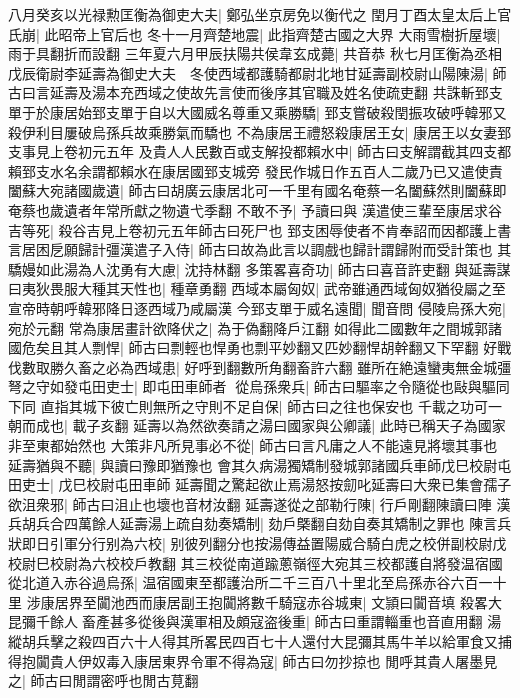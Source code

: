 八月癸亥以光禄勲匡衡為御吏大夫|{
	鄭弘坐京房免以衡代之}
閏月丁酉太皇太后上官氏崩|{
	此昭帝上官后也}
冬十一月齊楚地震|{
	此指齊楚古國之大界}
大雨雪樹折屋壞|{
	雨于具翻折而設翻}
三年夏六月甲辰扶陽共侯韋玄成薨|{
	共音恭}
秋七月匡衡為丞相戊辰衛尉李延壽為御史大夫　冬使西域都護騎都尉北地甘延壽副校尉山陽陳湯|{
	師古曰言延壽及湯本充西域之使故先言使而後序其官職及姓名使疏吏翻}
共誅斬郅支單于於康居始郅支單于自以大國威名尊重又乘勝驕|{
	郅支嘗破殺閏振攻破呼韓邪又殺伊利目屢破烏孫兵故乘勝氣而驕也}
不為康居王禮怒殺康居王女|{
	康居王以女妻郅支事見上卷初元五年}
及貴人人民數百或支解投都賴水中|{
	師古曰支解謂截其四支都賴郅支水名余謂都賴水在康居國郅支城旁}
發民作城日作五百人二歲乃已又遣使責闔蘇大宛諸國歲遺|{
	師古曰胡廣云康居北可一千里有國名奄蔡一名闔蘇然則闔蘇即奄蔡也歲遺者年常所獻之物遺弋季翻}
不敢不予|{
	予讀曰與}
漢遣使三輩至康居求谷吉等死|{
	殺谷吉見上卷初元五年師古曰死尸也}
郅支困辱使者不肯奉詔而因都護上書言居困戹願歸計彊漢遣子入侍|{
	師古曰故為此言以調戲也歸計謂歸附而受計策也}
其驕嫚如此湯為人沈勇有大慮|{
	沈持林翻}
多策畧喜奇功|{
	師古曰喜音許吏翻}
與延壽謀曰夷狄畏服大種其天性也|{
	種章勇翻}
西域本屬匈奴|{
	武帝雖通西域匈奴猶役屬之至宣帝時朝呼韓邪降日逐西域乃咸屬漢}
今郅支單于威名遠聞|{
	聞音問}
侵陵烏孫大宛|{
	宛於元翻}
常為康居畫計欲降伏之|{
	為于偽翻降戶江翻}
如得此二國數年之間城郭諸國危矣且其人剽悍|{
	師古曰剽輕也悍勇也剽平妙翻又匹妙翻悍胡幹翻又下罕翻}
好戰伐數取勝久畜之必為西域患|{
	好呼到翻數所角翻畜許六翻}
雖所在絶遠蠻夷無金城彊弩之守如發屯田吏士|{
	即屯田車師者}
從烏孫衆兵|{
	師古曰驅率之令隨從也敺與驅同下同}
直指其城下彼亡則無所之守則不足自保|{
	師古曰之往也保安也}
千載之功可一朝而成也|{
	載子亥翻}
延壽以為然欲奏請之湯曰國家與公卿議|{
	此時已稱天子為國家非至東都始然也}
大策非凡所見事必不從|{
	師古曰言凡庸之人不能遠見將壞其事也}
延壽猶與不聽|{
	與讀曰豫即猶豫也}
會其久病湯獨矯制發城郭諸國兵車師戊巳校尉屯田吏士|{
	戊巳校尉屯田車師}
延壽聞之驚起欲止焉湯怒按劎叱延壽曰大衆已集會孺子欲沮衆邪|{
	師古曰沮止也壞也音材汝翻}
延壽遂從之部勒行陳|{
	行戶剛翻陳讀曰陣}
漢兵胡兵合四萬餘人延壽湯上疏自劾奏矯制|{
	劾戶槩翻自劾自奏其矯制之罪也}
陳言兵狀即日引軍分行别為六校|{
	别彼列翻分也按湯傳益置陽威合騎白虎之校併副校尉戊校尉巳校尉為六校校戶教翻}
其三校從南道踰蔥嶺徑大宛其三校都護自將發温宿國從北道入赤谷過烏孫|{
	温宿國東至都護治所二千三百八十里北至烏孫赤谷六百一十里}
涉康居界至闐池西而康居副王抱闐將數千騎寇赤谷城東|{
	文頴曰闐音填}
殺畧大昆彌千餘人畜產甚多從後與漢軍相及頗寇盗後重|{
	師古曰重謂輜重也音直用翻}
湯縱胡兵擊之殺四百六十人得其所畧民四百七十人還付大昆彌其馬牛羊以給軍食又捕得抱闐貴人伊奴毒入康居東界令軍不得為寇|{
	師古曰勿抄掠也}
閒呼其貴人屠墨見之|{
	師古曰閒謂密呼也閒古莧翻}
